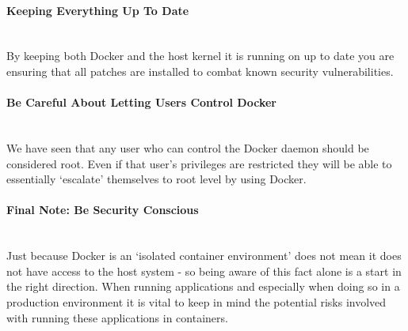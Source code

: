 \documentclass{article}
\begin{document}
\paragraph{Keeping Everything Up To Date}\mbox{}\\
By keeping both Docker and the host kernel it is running on up to date you are ensuring that all patches are installed to combat known security vulnerabilities.

\paragraph{Be Careful About Letting Users Control Docker}\mbox{}\\
We have seen that any user who can control the Docker daemon should be considered root. Even if that user's privileges are restricted they will be able to essentially `escalate' themselves to root level by using Docker.

\paragraph{Final Note: Be Security Conscious}\mbox{}\\
Just because Docker is an `isolated container environment' does not mean it does not have access to the host system - so being aware of this fact alone is a start in the right direction. When running applications and especially when doing so in a production environment it is vital to keep in mind the potential risks involved with running these applications in containers.

\newpage

\end{document}
